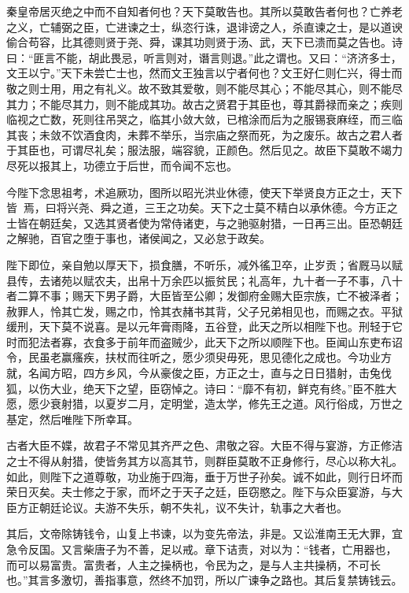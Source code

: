 \documentclass[12pt,UTF8]{ctexbook}
\begin{document}
秦皇帝居灭绝之中而不自知者何也？天下莫敢告也。其所以莫敢告者何也？亡养老之义，亡辅弼之臣，亡进谏之士，纵恣行诛，退诽谤之人，杀直谏之士，是以道谀偷合苟容，比其德则贤于尧、舜，课其功则贤于汤、武，天下已溃而莫之告也。诗曰：“匪言不能，胡此畏忌，听言则对，谮言则退。”此之谓也。又曰：“济济多士，文王以宁。”天下未尝亡士也，然而文王独言以宁者何也？文王好仁则仁兴，得士而敬之则士用，用之有礼义。故不致其爱敬，则不能尽其心；不能尽其心，则不能尽其力；不能尽其力，则不能成其功。故古之贤君于其臣也，尊其爵禄而亲之；疾则临视之亡数，死则往吊哭之，临其小敛大敛，已棺涂而后为之服锡衰麻绖，而三临其丧；未敛不饮酒食肉，未葬不举乐，当宗庙之祭而死，为之废乐。故古之君人者于其臣也，可谓尽礼矣；服法服，端容貌，正颜色。然后见之。故臣下莫敢不竭力尽死以报其上，功德立于后世，而令闻不忘也。



今陛下念思祖考，术追厥功，图所以昭光洪业休德，使天下举贤良方正之士，天下皆焉，曰将兴尧、舜之道，三王之功矣。天下之士莫不精白以承休德。今方正之士皆在朝廷矣，又选其贤者使为常侍诸吏，与之驰驱射猎，一日再三出。臣恐朝廷之解驰，百官之堕于事也，诸侯闻之，又必怠于政矣。



陛下即位，亲自勉以厚天下，损食膳，不听乐，减外徭卫卒，止岁贡；省厩马以赋县传，去诸苑以赋农夫，出帛十万余匹以振贫民；礼高年，九十者一子不事，八十者二算不事；赐天下男子爵，大臣皆至公卿；发御府金赐大臣宗族，亡不被泽者；赦罪人，怜其亡发，赐之巾，怜其衣赭书其背，父子兄弟相见也，而赐之衣。平狱缓刑，天下莫不说喜。是以元年膏雨降，五谷登，此天之所以相陛下也。刑轻于它时而犯法者寡，衣食多于前年而盗贼少，此天下之所以顺陛下也。臣闻山东吏布诏令，民虽老赢瘙疾，扶杖而往听之，愿少须臾毋死，思见德化之成也。今功业方就，名闻方昭，四方乡风，今从豪俊之臣，方正之士，直与之日日猎射，击兔伐狐，以伤大业，绝天下之望，臣窃悼之。诗曰：“靡不有初，鲜克有终。”臣不胜大愿，愿少衰射猎，以夏岁二月，定明堂，造太学，修先王之道。风行俗成，万世之基定，然后唯陛下所幸耳。



古者大臣不媟，故君子不常见其齐严之色、肃敬之容。大臣不得与宴游，方正修洁之士不得从射猎，使皆务其方以高其节，则群臣莫敢不正身修行，尽心以称大礼。如此，则陛下之道尊敬，功业施于四海，垂于万世子孙矣。诚不如此，则行日坏而荣日灭矣。夫士修之于家，而坏之于天子之廷，臣窃愍之。陛下与众臣宴游，与大臣方正朝廷论议。夫游不失乐，朝不失礼，议不失计，轨事之大者也。



其后，文帝除铸钱令，山复上书谏，以为变先帝法，非是。又讼淮南王无大罪，宜急令反国。又言柴唐子为不善，足以戒。章下诘责，对以为：“钱者，亡用器也，而可以易富贵。富贵者，人主之操柄也，令民为之，是与人主共操柄，不可长也。”其言多激切，善指事意，然终不加罚，所以广谏争之路也。其后复禁铸钱云。
\end{document}
